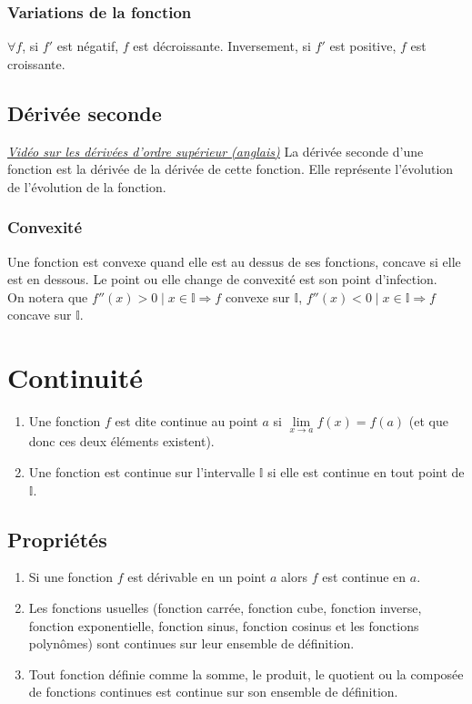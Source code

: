 \documentclass{article}
\begin{document}
\subsubsection{Variations de la fonction}
$\forall f$, si $f'$ est négatif, $f$ est décroissante. Inversement, si $f'$ est positive, $f$ est croissante.


\subsection{Dérivée seconde}
\href{https://youtu.be/BLkz5LGWihw}{\underline{\textit{Vidéo sur les dérivées d'ordre supérieur (anglais)}}}
La dérivée seconde d'une fonction est la dérivée de la dérivée de cette fonction. Elle représente l'évolution de l'évolution de la fonction.

\subsubsection{Convexité}
Une fonction est convexe quand elle est au dessus de ses fonctions, concave si elle est en dessous. Le point ou elle change de convexité est son point d'infection.\\
On notera que $f''(x)>0 \mid x\in \mathbb{I} \Rightarrow f$ convexe sur $\mathbb{I}$, $f''(x)<0 \mid x\in \mathbb{I} \Rightarrow f$ concave sur $\mathbb{I}$.

\section{Continuité}
\begin{enumerate}
	\item Une fonction $f$ est dite continue au point $a$ si $\lim \limits_{x \rightarrow a} f(x) = f(a)$ (et que donc ces deux éléments existent).
	\item Une fonction est continue sur l'intervalle $\mathbb{I}$ si elle est continue en tout point de $\mathbb{I}$.
\end{enumerate}
\subsection{Propriétés}
\begin{enumerate}
	\item Si une fonction $f$ est dérivable en un point $a$ alors $f$ est continue en $a$.
	\item Les fonctions usuelles (fonction carrée, fonction cube, fonction inverse, fonction exponentielle, fonction sinus, fonction cosinus et les fonctions polynômes) sont continues sur leur ensemble de définition.
	\item Tout fonction définie comme la somme, le produit, le quotient ou la composée de fonctions continues est continue sur son ensemble de définition.
\end{enumerate}
\end{document}

